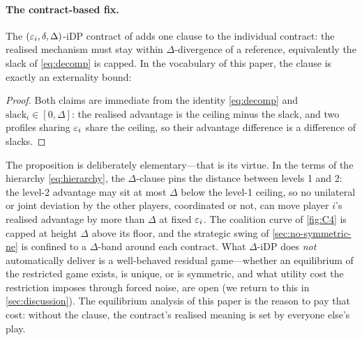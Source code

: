 \paragraph{The contract-based fix.} The
$(\varepsilon_i,\delta,\Delta)$-iDP contract of \citet{kaiser2026your,
kaissis2024beyond} adds one clause to the individual contract: the
realised mechanism must stay within $\Delta$-divergence of a
reference, equivalently the slack of \eqref{eq:decomp} is capped.
In the vocabulary of this paper, the clause is exactly an externality
bound:


\begin{proof}
Both claims are immediate from the identity \eqref{eq:decomp} and
$\mathrm{slack}_i \in [0, \Delta]$: the realised advantage is the
ceiling minus the slack, and two profiles sharing $\varepsilon_i$ share the
ceiling, so their advantage difference is a difference of slacks.
\end{proof}

The proposition is deliberately elementary---that is its virtue. In
the terms of the hierarchy \eqref{eq:hierarchy}, the $\Delta$-clause
pins the distance between levels 1 and 2: the level-2 advantage may
sit at most $\Delta$ below the level-1 ceiling, so no unilateral or
joint deviation by the other players, coordinated or not, can move
player $i$'s realised advantage by more than $\Delta$ at fixed
$\varepsilon_i$. The coalition curve of \cref{fig:C4} is capped at height
$\Delta$ above its floor, and the strategic swing of
\cref{sec:no-symmetric-ne} is confined to a $\Delta$-band around each contract.
What $\Delta$-iDP does \emph{not} automatically deliver is a
well-behaved residual game---whether an equilibrium of the restricted
game exists, is unique, or is symmetric, and what utility cost the
restriction imposes through forced noise, are open (we return to
this in \cref{sec:discussion}). The equilibrium analysis of this
paper is the reason to pay that cost: without the clause, the
contract's realised meaning is set by everyone else's play.
